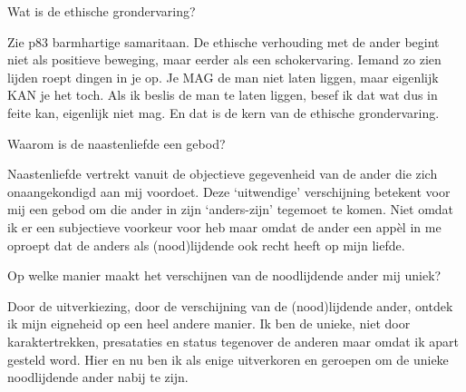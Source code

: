 \documentclass[main.tex]{subfiles}
\begin{document}
\begin{examenvraag}
    \begin{vraag}
        Wat is de ethische grondervaring?
    \end{vraag}


    \begin{antwoord}
        Zie p83 barmhartige samaritaan.
        De ethische verhouding met de ander begint niet als positieve beweging, maar eerder als een schokervaring. 
        Iemand zo zien lijden roept dingen in je op.
        Je MAG de man niet laten liggen, maar eigenlijk KAN je het toch.
        Als ik beslis de man te laten liggen, besef ik dat wat dus in feite kan, eigenlijk niet mag. 
        En dat is de kern van de ethische grondervaring.
    \end{antwoord}
\end{examenvraag}


\begin{examenvraag}
    \begin{vraag}
        Waarom is de naastenliefde een gebod?
    \end{vraag}

    \begin{antwoord}
	Naastenliefde vertrekt vanuit de objectieve gegevenheid van de ander die zich onaangekondigd 
	aan mij voordoet.‭ ‬Deze‭ ‬‘uitwendige‭’‬ verschijning betekent voor mij een gebod om die ander in 
	zijn‭ ‬‘anders-zijn‭’‬ tegemoet te komen.‭ ‬Niet omdat ik er een subjectieve voorkeur voor heb maar 
	omdat de ander een appèl in me oproept dat de anders als‭ (‬nood)lijdende ook recht heeft op mijn 
	liefde.
    \end{antwoord}
\end{examenvraag}


\begin{examenvraag}
    \begin{vraag}
        Op welke manier maakt het verschijnen van de noodlijdende ander mij uniek?
    \end{vraag}

    \begin{antwoord}
	Door de uitverkiezing,‭ ‬door de verschijning van de‭ (‬nood)lijdende ander,‭ ‬ontdek ik mijn 
	eigneheid op een heel andere manier.‭ ‬Ik ben de unieke,‭ ‬niet door karaktertrekken,‭ ‬presataties 
	en status tegenover de anderen‭ ‬maar omdat ik apart gesteld word.‭ ‬Hier en nu ben ik als enige 
	uitverkoren en geroepen om de unieke noodlijdende ander nabij te zijn.
    \end{antwoord}
\end{examenvraag}
\end{document}

